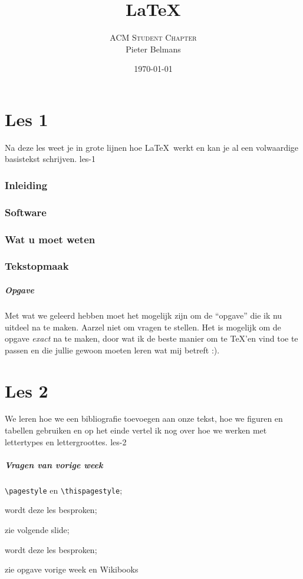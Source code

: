 \documentclass{beamer}
\title{\LaTeX}
\date{\today}
\author{\textsc{ACM Student Chapter} \\ Pieter Belmans}
\newcommand\exercise{
\begin{frame}
  \frametitle{Opgave}

  Met wat we geleerd hebben moet het mogelijk zijn om de ``opgave'' die ik nu uitdeel na te maken. Aarzel niet om vragen te stellen. Het is mogelijk om de opgave \emph{exact} na te maken, door wat ik de beste manier om te \TeX'en vind toe te passen en die jullie gewoon moeten leren wat mij betreft :).
\end{frame}
}
\begin{document}
\begin{frame}
  \titlepage
\end{frame}

\part{Les 1}
\lecture
{Na deze les weet je in grote lijnen hoe \LaTeX\ werkt en kan je al een volwaardige basistekst schrijven.}
{les-1}
\section{Inleiding}

\section{Software}

\section{Wat u moet weten}

\section{Tekstopmaak}


\exercise

\part{Les 2}
\lecture
{We leren hoe we een bibliografie toevoegen aan onze tekst, hoe we figuren en tabellen gebruiken en op het einde vertel ik nog over hoe we werken met lettertypes en lettergroottes.}
{les-2}
\begin{frame}
  \frametitle{Vragen van vorige week}

  \begin{description}
    \item[paginanummering] \texttt{\textcolor{uagreen}{\textbackslash pagestyle}} en \texttt{\textcolor{uagreen}{\textbackslash thispagestyle}};
    \item[lettertypes] wordt deze les besproken;
    \item[bad boxes] zie volgende slide;
    \item[tabellen uit Excel] wordt deze les besproken;
    \item[\texttt{\textcolor{uagreen}{\textbackslash parindent}}] zie opgave vorige week en Wikibooks
  \end{description}
\end{frame}
\end{document}

